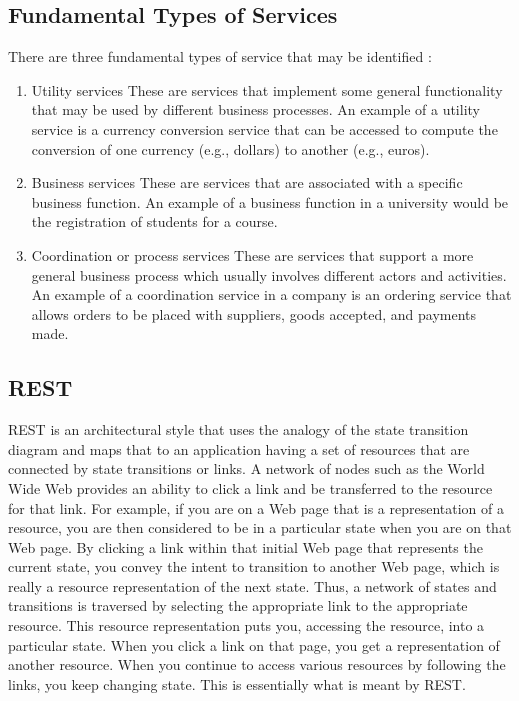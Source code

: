 \documentclass[12pt,a4paper,final,twoside,onecolumn,titlepage]{book}
\begin{document}
\subsection{Fundamental Types of Services}
There are three fundamental types of service that may be identified \cite{BS58}:
\begin{enumerate}
\item Utility services These are services that implement some general functionality that may be used by different business processes. An example of a utility service is a currency conversion service that can be accessed to compute the conversion of one currency (e.g., dollars) to another (e.g., euros).
\item Business services These are services that are associated with a specific business function. An example of a business function in a university would be the registration of students for a course.
\item Coordination or process services These are services that support a more general business process which usually involves different actors and activities. An example of a coordination service in a company is an ordering service that allows orders to be placed with suppliers, goods accepted, and payments made.
\end{enumerate}

\subsection{REST}
REST is an architectural style that uses the analogy of the state transition diagram and maps that to an application having a set of resources that are connected by state transitions or links. A network of nodes such as the World Wide Web provides an ability to click a link and be transferred to the resource for that link. For example, if you are on a Web page that is a representation of a resource, you are then considered to be in a particular state when you are on that Web page. By clicking a link within that initial Web page that represents the current state, you convey the intent to transition to another Web page, which is really a resource representation of the next state. Thus, a network of states and transitions is traversed by selecting the appropriate link to the appropriate resource. This resource representation puts you, accessing the resource, into a particular state. When you click a link on that page, you get a representation of another resource. When you continue to access various resources by following the links, you keep changing state. This is essentially what is meant by REST.
\end{document}
